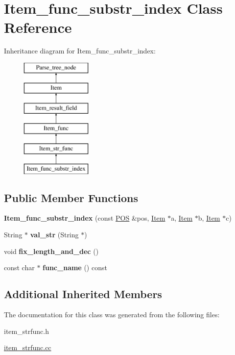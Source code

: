 \hypertarget{classItem__func__substr__index}{}\section{Item\+\_\+func\+\_\+substr\+\_\+index Class Reference}
\label{classItem__func__substr__index}
Inheritance diagram for Item\+\_\+func\+\_\+substr\+\_\+index\+:\begin{figure}[H]
\begin{center}
\leavevmode
\includegraphics[height=6.000000cm]{classItem__func__substr__index}
\end{center}
\end{figure}
\subsection*{Public Member Functions}
\begin{DoxyCompactItemize}
\item 
\mbox{\label{classItem__func__substr__index_a4d5d27361ff75159cfdfefe19ba62810}} 
{\bfseries Item\+\_\+func\+\_\+substr\+\_\+index} (const \mbox{\hyperlink{structYYLTYPE}{P\+OS}} \&pos, \mbox{\hyperlink{classItem}{Item}} $\ast$a, \mbox{\hyperlink{classItem}{Item}} $\ast$b, \mbox{\hyperlink{classItem}{Item}} $\ast$c)
\item 
\mbox{\label{classItem__func__substr__index_af7d7caa7022e48af438544af1383a953}} 
String $\ast$ {\bfseries val\+\_\+str} (String $\ast$)
\item 
\mbox{\label{classItem__func__substr__index_ae2711d57ab5624f1da92d875671a1e8d}} 
void {\bfseries fix\+\_\+length\+\_\+and\+\_\+dec} ()
\item 
\mbox{\label{classItem__func__substr__index_a7f0cf20524775026b8d10e0a7c22e696}} 
const char $\ast$ {\bfseries func\+\_\+name} () const
\end{DoxyCompactItemize}
\subsection*{Additional Inherited Members}


The documentation for this class was generated from the following files\+:\begin{DoxyCompactItemize}
\item 
item\+\_\+strfunc.\+h\item 
\mbox{\hyperlink{item__strfunc_8cc}{item\+\_\+strfunc.\+cc}}\end{DoxyCompactItemize}
